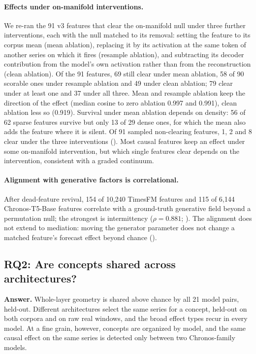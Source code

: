 \paragraph{Effects under on-manifold interventions.} We re-ran the 91 v3 features that clear the on-manifold null under
three further interventions, each with the null matched to its removal: setting the feature to its corpus mean (mean
ablation), replacing it by its activation at the same token of another series on which it fires (resample ablation), and
subtracting its decoder contribution from the model's own activation rather than from the reconstruction (clean
ablation). Of the 91 features, 69 still clear under mean ablation, 58 of 90 scorable ones under resample ablation and 49
under clean ablation; 79 clear under at least one and 37 under all three. Mean and resample ablation keep the direction of
the effect (median cosine to zero ablation 0.997 and 0.991), clean ablation less so (0.919). Survival under mean ablation
depends on density: 56 of 62 sparse features survive but only 13 of 29 dense ones, for which the mean also adds the
feature where it is silent. Of 91 sampled non-clearing features, 1, 2 and 8 clear under the three interventions
(). Most causal features keep an effect under some on-manifold intervention, but which single features clear
depends on the intervention, consistent with a graded continuum.

\paragraph{Alignment with generative factors is correlational.} After dead-feature revival, 154 of 10{,}240 TimesFM
features and 115 of 6{,}144 Chronos-T5-Base features correlate with a ground-truth generative field beyond a permutation
null; the strongest is intermittency ($\rho=0.881$; ). The alignment does not extend to mediation: moving the
generator parameter does not change a matched feature's forecast effect beyond chance ().

\subsection{RQ2: Are concepts shared across architectures?}
\label{sec:rq2}

\textbf{Answer.} Whole-layer geometry is shared above chance by all 21 model pairs, held-out. Different architectures
select the same series for a concept, held-out on both corpora and on raw real windows, and the broad effect types recur
in every model. At a fine grain, however, concepts are organized by model, and the same causal effect on the same series
is detected only between two Chronos-family models.

